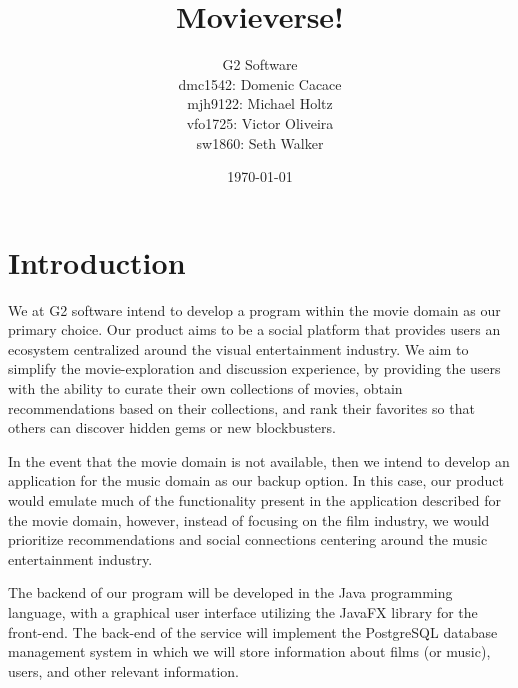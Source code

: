 \documentclass[12pt]{article}
\title{Movieverse!}
\date{\today}
\author{G2 Software\\
dmc1542: Domenic Cacace\\
mjh9122: Michael Holtz\\
vfo1725: Victor Oliveira\\
sw1860: Seth Walker\\
}
\begin{document}
    \maketitle


    \section{Introduction}
    We at G2 software intend to develop a program within the movie domain as our primary choice. Our product aims to be a social platform that provides users an ecosystem centralized around the visual entertainment industry. We aim to simplify the movie-exploration and discussion experience, by providing the users with the ability to curate their own collections of movies, obtain recommendations based on their collections, and rank their favorites so that others can discover hidden gems or new blockbusters.

    In the event that the movie domain is not available, then we intend to develop an application for the music domain as our backup option. In this case, our product would emulate much of the functionality present in the application described for the movie domain, however, instead of focusing on the film industry, we would prioritize recommendations and social connections centering around the music entertainment industry.

    The backend of our program will be developed in the Java programming language, with a graphical user interface utilizing the JavaFX library for the front-end. The back-end of the service will implement the PostgreSQL database management system in which we will store information about films (or music), users, and other relevant information.
\end{document}
